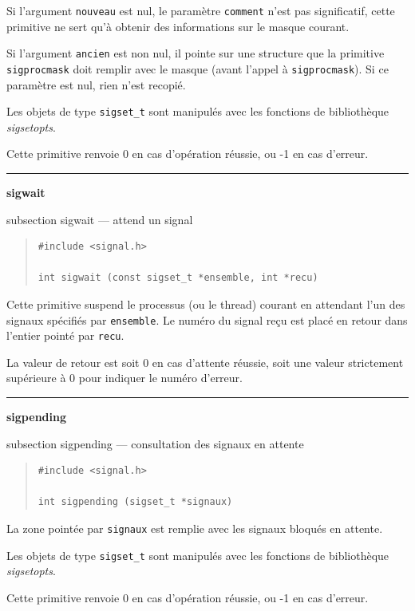 \documentclass [twoside] {report}
\newcommand {\primitive} [1]
    {
	\phantomsection
	{\large \textbf {#1}}
	\addcontentsline {toc} {subsection} {#1}
    }
\newcommand {\separation}
    {
	\vspace {5mm}
	\nopagebreak
	\hrule
    }
\begin{document}
Si l'argument \texttt {nouveau} est nul, le paramètre \texttt {comment}
n'est pas significatif, cette primitive ne sert qu'à obtenir des
informations sur le masque courant.

Si l'argument \texttt {ancien} est non nul, il pointe sur une structure que
la primitive \texttt {sigprocmask} doit remplir avec le masque (avant
l'appel à \texttt {sigprocmask}).  Si ce paramètre est nul, rien n'est
recopié.

Les objets de type \texttt {sigset\_t} sont manipulés avec les fonctions de
bibliothèque \emph {sigsetopts}.

Cette primitive renvoie 0 en cas d'opération réussie, ou -1 en cas
d'erreur.



\separation
\primitive {sigwait} --- attend un signal
    \label {sigwait}

\begin {quote}
\begin {verbatim}
#include <signal.h>

int sigwait (const sigset_t *ensemble, int *recu)
\end{verbatim}
\end {quote}

Cette primitive suspend le processus (ou le thread) courant en attendant
l'un des signaux spécifiés par \texttt {ensemble}. Le numéro du signal
reçu est placé en retour dans l'entier pointé par \texttt {recu}.

La valeur de retour est soit 0 en cas d'attente réussie, soit une valeur
strictement supérieure à 0 pour indiquer le numéro d'erreur.


\separation
\primitive {sigpending} --- consultation des signaux en attente

\begin {quote}
\begin {verbatim}
#include <signal.h>

int sigpending (sigset_t *signaux)
\end{verbatim}
\end {quote}

La zone pointée par \texttt {signaux} est remplie avec les signaux bloqués
en attente.

Les objets de type \texttt {sigset\_t} sont manipulés avec les fonctions de
bibliothèque \emph {sigsetopts}.

Cette primitive renvoie 0 en cas d'opération réussie, ou -1 en cas
d'erreur.
\end{document}
